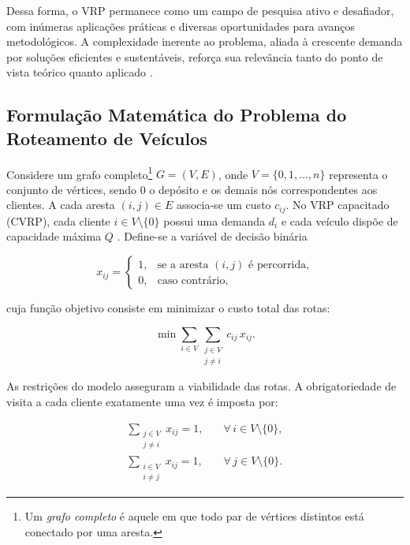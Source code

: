 Dessa forma, o VRP permanece como um campo de pesquisa ativo e desafiador, com inúmeras aplicações práticas e diversas oportunidades para avanços metodológicos. A complexidade inerente ao problema, aliada à crescente demanda por soluções eficientes e sustentáveis, reforça sua relevância tanto do ponto de vista teórico quanto aplicado \cite{braekers2016vehicle, moghdani2021green}.

\subsection{Formulação Matemática do Problema do Roteamento de Veículos}


Considere um grafo completo\footnote{Um \textit{grafo completo} é aquele em que todo par de vértices distintos está conectado por uma aresta.} $G = (V, E)$, onde $V = \{0, 1, \dots, n\}$ representa o conjunto de vértices, sendo $0$ o depósito e os demais nós correspondentes aos clientes. A cada aresta $(i,j) \in E$ associa-se um custo $c_{ij}$. No VRP capacitado (CVRP), cada cliente $i \in V \setminus \{0\}$ possui uma demanda $d_i$ e cada veículo dispõe de capacidade máxima $Q$ \cite{huang_solving_nodate}. Define-se a variável de decisão binária

\begin{equation}
    x_{ij} =
    \begin{cases}
        1, & \text{se a aresta } (i,j) \text{ é percorrida,} \\
        0, & \text{caso contrário,}
    \end{cases}
\end{equation}

\noindent cuja função objetivo consiste em minimizar o custo total das rotas:

\begin{equation}
    \min \sum_{i \in V} \sum_{\substack{j \in V \\ j \neq i}} c_{ij}\, x_{ij}.
\end{equation}

As restrições do modelo asseguram a viabilidade das rotas. A obrigatoriedade de visita a cada cliente exatamente uma vez é imposta por:

\begin{eqnarray}
\sum_{\substack{j \in V \\ j \neq i}} x_{ij} = 1, & \quad \forall\, i \in V \setminus \{0\}, \label{eq:only_client}\\[4pt]
\sum_{\substack{i \in V \\ i \neq j}} x_{ij} = 1, & \quad \forall\, j \in V \setminus \{0\}. \label{eq:only_city}
\end{eqnarray}

